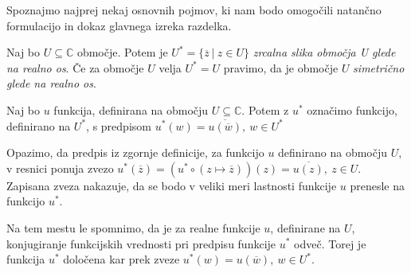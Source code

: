 \documentclass[mat1, tisk]{fmfdelo}
\begin{document}
    Spoznajmo najprej nekaj osnovnih pojmov, ki nam bodo omogočili natančno formulacijo in dokaz glavnega izreka razdelka.
    \begin{definicija}
        Naj bo $U \subseteq \mathbb{C}$ območje. Potem je $U^* = \{\overline{z}~|~z \in U\}$ \emph{zrcalna slika območja U glede na realno os}.
        Če za območje $U$ velja $U^* = U$ pravimo, da je območje $U$ \emph{simetrično glede na realno os}.
    \end{definicija}

    \begin{definicija}
        Naj bo $u$ funkcija, definirana na območju $U \subseteq \mathbb{C}$. Potem z \emph{$u^*$} označimo funkcijo, definirano na $U^*$, s predpisom $u^*(w) = \overline{u(\overline{w})},~w \in U^*$
    \end{definicija}

    Opazimo, da predpis iz zgornje definicije, za funkcijo $u$ definirano na območju $U$, v resnici ponuja zvezo $u^*(\overline{z}) = (u^* \circ (z \mapsto \overline{z}))(z) = \overline{u(z)},~z \in U$.
    Zapisana zveza nakazuje, da se bodo v veliki meri lastnosti funkcije $u$ prenesle na funkcijo $u^*$.

    \begin{opomba}
        Na tem mestu le spomnimo, da je za realne funkcije $u$, definirane na $U$, konjugiranje funkcijskih vrednosti pri predpisu funkcije $u^*$ odveč. Torej je funkcija $u^*$ določena kar prek zveze $u^*(w) = u(\overline{w}),~w \in U^*$.
    \end{opomba}
\end{document}
